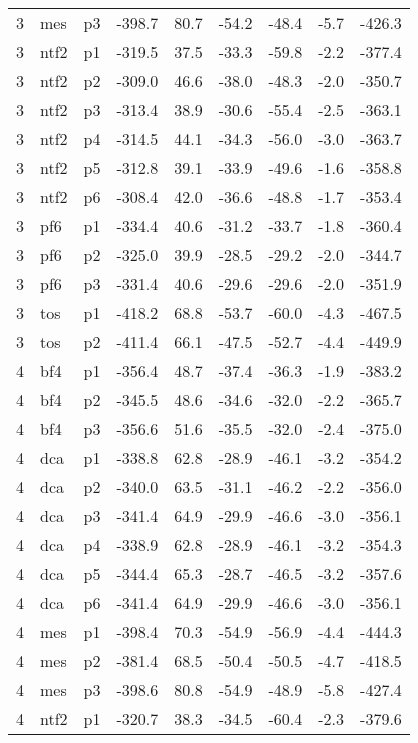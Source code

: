 \documentclass[a4paper]{article}
\begin{document}
\begin{table}[ht]
\begin{tabular}{rllrrrrrr}
   3 & mes & p3 & -398.7 & 80.7 & -54.2 & -48.4 & -5.7 & -426.3 \\ 
   3 & ntf2 & p1 & -319.5 & 37.5 & -33.3 & -59.8 & -2.2 & -377.4 \\ 
   3 & ntf2 & p2 & -309.0 & 46.6 & -38.0 & -48.3 & -2.0 & -350.7 \\ 
   3 & ntf2 & p3 & -313.4 & 38.9 & -30.6 & -55.4 & -2.5 & -363.1 \\ 
   3 & ntf2 & p4 & -314.5 & 44.1 & -34.3 & -56.0 & -3.0 & -363.7 \\ 
   3 & ntf2 & p5 & -312.8 & 39.1 & -33.9 & -49.6 & -1.6 & -358.8 \\ 
   3 & ntf2 & p6 & -308.4 & 42.0 & -36.6 & -48.8 & -1.7 & -353.4 \\ 
   3 & pf6 & p1 & -334.4 & 40.6 & -31.2 & -33.7 & -1.8 & -360.4 \\ 
   3 & pf6 & p2 & -325.0 & 39.9 & -28.5 & -29.2 & -2.0 & -344.7 \\ 
   3 & pf6 & p3 & -331.4 & 40.6 & -29.6 & -29.6 & -2.0 & -351.9 \\ 
   3 & tos & p1 & -418.2 & 68.8 & -53.7 & -60.0 & -4.3 & -467.5 \\ 
   3 & tos & p2 & -411.4 & 66.1 & -47.5 & -52.7 & -4.4 & -449.9 \\ 
   4 & bf4 & p1 & -356.4 & 48.7 & -37.4 & -36.3 & -1.9 & -383.2 \\ 
   4 & bf4 & p2 & -345.5 & 48.6 & -34.6 & -32.0 & -2.2 & -365.7 \\ 
   4 & bf4 & p3 & -356.6 & 51.6 & -35.5 & -32.0 & -2.4 & -375.0 \\ 
   4 & dca & p1 & -338.8 & 62.8 & -28.9 & -46.1 & -3.2 & -354.2 \\ 
   4 & dca & p2 & -340.0 & 63.5 & -31.1 & -46.2 & -2.2 & -356.0 \\ 
   4 & dca & p3 & -341.4 & 64.9 & -29.9 & -46.6 & -3.0 & -356.1 \\ 
   4 & dca & p4 & -338.9 & 62.8 & -28.9 & -46.1 & -3.2 & -354.3 \\ 
   4 & dca & p5 & -344.4 & 65.3 & -28.7 & -46.5 & -3.2 & -357.6 \\ 
   4 & dca & p6 & -341.4 & 64.9 & -29.9 & -46.6 & -3.0 & -356.1 \\ 
   4 & mes & p1 & -398.4 & 70.3 & -54.9 & -56.9 & -4.4 & -444.3 \\ 
   4 & mes & p2 & -381.4 & 68.5 & -50.4 & -50.5 & -4.7 & -418.5 \\ 
   4 & mes & p3 & -398.6 & 80.8 & -54.9 & -48.9 & -5.8 & -427.4 \\ 
   4 & ntf2 & p1 & -320.7 & 38.3 & -34.5 & -60.4 & -2.3 & -379.6 \\ 

\end{tabular}
\end{table}
\end{document}
